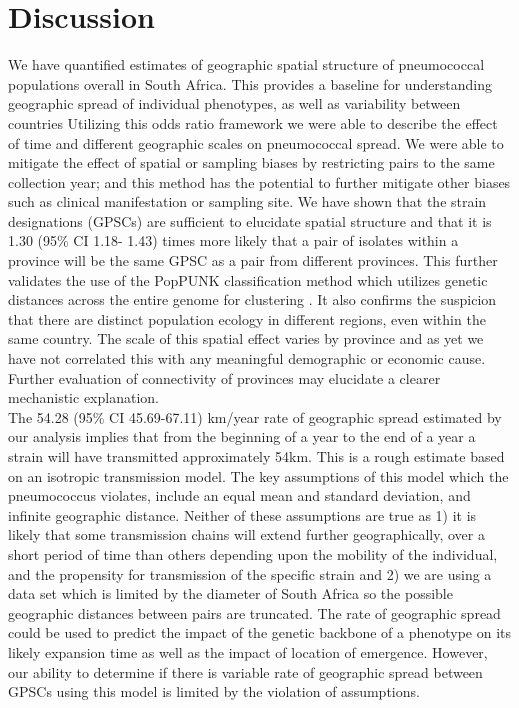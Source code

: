 \documentclass{article}
\begin{document}
\section{Discussion}
We have quantified estimates of geographic spatial structure of pneumococcal populations overall in South Africa. This provides a baseline for understanding geographic spread of individual phenotypes, as well as variability between countries Utilizing this odds ratio framework we were able to describe the effect of time and different geographic scales on pneumococcal spread.  We were able to mitigate the effect of spatial or sampling biases by restricting pairs to the same collection year; and this method has the potential to further mitigate other biases such as clinical manifestation or sampling site. We have shown that the strain designations (GPSCs) are sufficient to elucidate spatial structure and that it is 1.30 (95\% CI 1.18- 1.43) times more likely that a pair of isolates within a province will be the same GPSC as a pair from different provinces. This further validates the use of the PopPUNK classification method which utilizes genetic distances across the entire genome for clustering \cite{leesFastFlexibleBacterial2019}. It also confirms the suspicion that there are distinct population ecology in different regions, even within the same country. The scale of this spatial effect varies by province and as yet we have not correlated this with any meaningful demographic or economic cause. Further evaluation of connectivity of provinces may elucidate a clearer mechanistic explanation. 
 \\The 54.28 (95\% CI 45.69-67.11) km/year rate of geographic spread estimated by our analysis implies that from the beginning of a year to the end of a year a strain will have transmitted approximately 54km. This is a rough estimate based on an isotropic transmission model. The key assumptions of this model which the pneumococcus violates, include an equal mean and standard deviation, and infinite geographic distance. Neither of these assumptions are true as 1) it is likely that some transmission chains will extend further geographically, over a short period of time than others depending upon the mobility of the individual, and the propensity for transmission of the specific strain and 2) we are using a data set which is limited by the diameter of South Africa so the possible geographic distances between pairs are truncated. The rate of geographic spread could be used to predict the impact of the genetic backbone of a phenotype on its likely expansion time as well as the impact of location of emergence. However, our ability to determine if there is variable rate of geographic spread between GPSCs using this model is limited by the violation of assumptions. 
\end{document}
